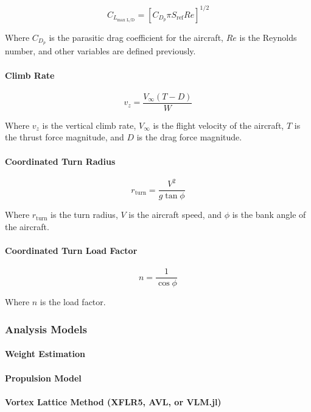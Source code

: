 \documentclass[report]{byu-aero}
\begin{document}
\[C_{L_\text{max L/D}} = \left[ C_{D_p} \pi S_\text{ref} Re \right]^{1/2}\]

Where \(C_{D_p}\) is the parasitic drag coefficient for the aircraft, \(Re\) is the Reynolds number, and other variables are defined previously.


\paragraph{Climb Rate}

\[ v_z = \frac{V_\infty \left(T - D\right)}{W}\]

Where \(v_z\) is the vertical climb rate, \(V_\infty\) is the flight velocity of the aircraft, \(T\) is the thrust force magnitude, and \(D\) is the drag force magnitude.


\paragraph{Coordinated Turn Radius}

\[r_\text{turn} = \frac{V^2}{g \tan\phi}\]

Where \(r_\text{turn}\) is the turn radius, \(V\) is the aircraft speed, and \(\phi\) is the bank angle of the aircraft.

\paragraph{Coordinated Turn Load Factor}

\[n = \frac{1}{\cos\phi}\]

Where \(n\) is the load factor.

\subsubsection{Analysis Models}


\paragraph{Weight Estimation}


\paragraph{Propulsion Model}


\paragraph{Vortex Lattice Method (XFLR5, AVL, or VLM.jl)}
\end{document}
